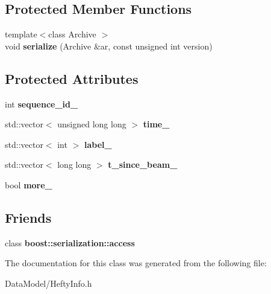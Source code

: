 \subsection*{Protected Member Functions}
\begin{DoxyCompactItemize}
\item 
\hypertarget{classHeftyInfo_ae49337fd12c7bd8d0151953aff75a613}{
{\footnotesize template$<$class Archive $>$ }\\void {\bfseries serialize} (Archive \&ar, const unsigned int version)}
\label{classHeftyInfo_ae49337fd12c7bd8d0151953aff75a613}

\end{DoxyCompactItemize}
\subsection*{Protected Attributes}
\begin{DoxyCompactItemize}
\item 
\hypertarget{classHeftyInfo_a0dab6f58a2c3719e087bc18b6e32e528}{
int {\bfseries sequence\_\-id\_\-}}
\label{classHeftyInfo_a0dab6f58a2c3719e087bc18b6e32e528}

\item 
\hypertarget{classHeftyInfo_a49dcdefaf94072a936aaba0f4d335b7b}{
std::vector$<$ unsigned long long $>$ {\bfseries time\_\-}}
\label{classHeftyInfo_a49dcdefaf94072a936aaba0f4d335b7b}

\item 
\hypertarget{classHeftyInfo_a8c18908b972555f6da8137ff67124eaf}{
std::vector$<$ int $>$ {\bfseries label\_\-}}
\label{classHeftyInfo_a8c18908b972555f6da8137ff67124eaf}

\item 
\hypertarget{classHeftyInfo_a68c89d555a59e08992862804591d4876}{
std::vector$<$ long long $>$ {\bfseries t\_\-since\_\-beam\_\-}}
\label{classHeftyInfo_a68c89d555a59e08992862804591d4876}

\item 
\hypertarget{classHeftyInfo_a800c1fb5443ae90314bd670e88d0afd9}{
bool {\bfseries more\_\-}}
\label{classHeftyInfo_a800c1fb5443ae90314bd670e88d0afd9}

\end{DoxyCompactItemize}
\subsection*{Friends}
\begin{DoxyCompactItemize}
\item 
\hypertarget{classHeftyInfo_ac98d07dd8f7b70e16ccb9a01abf56b9c}{
class {\bfseries boost::serialization::access}}
\label{classHeftyInfo_ac98d07dd8f7b70e16ccb9a01abf56b9c}

\end{DoxyCompactItemize}


The documentation for this class was generated from the following file:\begin{DoxyCompactItemize}
\item 
DataModel/HeftyInfo.h\end{DoxyCompactItemize}
